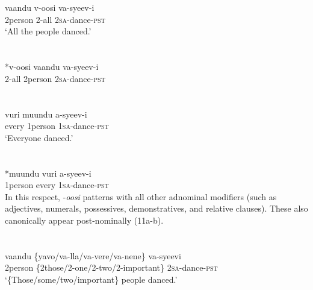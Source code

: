 \documentclass[output=paper]{langsci/langscibook}
\begin{document}
\chapter{}
\gll vaandu    v-oosi    va-syeev-i    \\
     2person    2-all    2\textsc{sa}{}-dance-\textsc{pst  }     \\
\glt ‘All the people danced.’
\z

\chapter{}
\gll \textup{*}v-oosi    vaandu  va-syeev-i  \\
     2-all    2person  2\textsc{sa}{}-dance-\textsc{pst  }\\
\chapter{}
\chapter{}
\gll vuri    muundu  a-syeev-i    \\
     every    1person  1\textsc{sa}{}-dance-\textsc{pst  }     \\
\glt ‘Everyone danced.’
\z

\chapter{}
\gll \textup{*}muundu  vuri    a-syeev-i  \\
     1person    every    1\textsc{sa}{}-dance-\textsc{pst  }  \\
In this respect, -\textit{oosi} patterns with all other adnominal modifiers (such as adjectives, numerals, possessives, demonstratives, and relative clauses). These also canonically appear post-nominally (11a-b). 

\chapter{}
\chapter{}
\gll vaandu  \{yavo/va-lla/va-vere/va-nene\}    va-syeevi  \\
     2person  \{2those/2-one/2-two/2-important\} 2\textsc{sa}{}-dance-\textsc{pst}\\
\glt ‘\{Those/some/two/important\} people danced.’
\z
\end{document}
